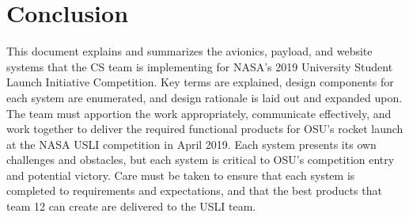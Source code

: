 \documentclass[journal,10pt,draftclsnofoot,onecolumn,compsoc]{IEEEtran} \usepackage[margin=0.75in]{geometry}
\begin{document}
\newpage
\section{Conclusion}
This document explains and summarizes the avionics, payload, and website systems that the CS team is implementing for NASA's 2019 University Student Launch Initiative Competition. Key terms are explained, design components for each system are enumerated, and design rationale is laid out and expanded upon. The team must apportion the work appropriately, communicate effectively, and work together to deliver the required functional products for OSU's rocket launch at the NASA USLI competition in April 2019. Each system presents its own challenges and obstacles, but each system is critical to OSU's competition entry and potential victory. Care must be taken to ensure that each system is completed to requirements and expectations, and that the best products that team 12 can create are delivered to the USLI team.
\end{document}
